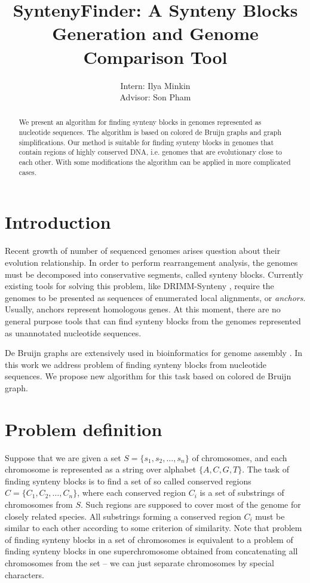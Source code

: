 \documentclass[a4paper,12pt]{scrartcl}
\begin{document}
\title{SyntenyFinder: A Synteny Blocks Generation and Genome Comparison Tool}
\author{Intern: Ilya Minkin\\
	Advisor: Son Pham}
\date{}
\maketitle

\begin{abstract}
We present an algorithm for finding synteny blocks in genomes represented as nucleotide sequences. The algorithm is based
on colored de Bruijn graphs and graph simplifications. Our method is suitable for finding synteny blocks in genomes that
contain regions of highly conserved DNA, i.e. genomes that are evolutionary close to each other. With some modifications
the algorithm can be applied in more complicated cases.

\end{abstract}

\section{Introduction}

Recent growth of number of sequenced genomes arises question about their evolution relationship. 
In order to perform rearrangement analysis, the genomes must be decomposed into conservative segments,
called synteny blocks. Currently existing tools for solving this problem, like DRIMM-Synteny
\cite{Pham2010}, require the genomes to be presented as sequences of enumerated local alignments, or \textit{anchors}.
Usually, anchors represent homologous genes. At this moment, there are no general purpose tools that can
find synteny blocks from the genomes represented as unannotated nucleotide sequences.

De Bruijn graphs are extensively used in bioinformatics for genome assembly \cite{Pevzner2001, Iqbal2012}. 
In this work we address problem of finding synteny blocks from nucleotide sequences. We propose new 
algorithm for this task based on colored de Bruijn graph.

\section{Problem definition}

Suppose that we are given a set \(S = \lbrace s_{1}, s_{2}, \ldots, s_{n} \rbrace \) of chromosomes, and each
chromosome is represented as a string over alphabet \(\lbrace A, C, G, T \rbrace \). The task of finding synteny
blocks is to find a set of so called conserved regions \(C = \lbrace C_{1}, C_{2}, \ldots , C_{n} \rbrace \), where
each conserved region \(C_{i}\) is a set of substrings of chromosomes from \(S\). Such regions are supposed 
to cover most of the genome for closely related species.  All substrings forming a conserved region \(C_{i}\) must be
similar to each other according to some criterion of similarity. Note that problem of finding synteny blocks in a set
of chromosomes is equivalent to a problem of finding synteny blocks in one superchromosome
obtained from concatenating all chromosomes from the set -- we can just separate chromosomes by special characters.
\end{document}
